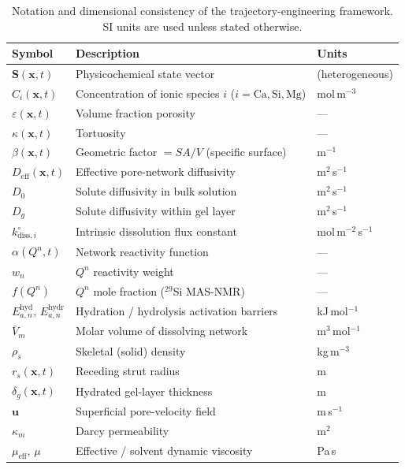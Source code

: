 \documentclass[11pt]{article}
\newcommand{\tablesize}{\fontsize{8.5pt}{10pt}\selectfont}
\newcommand{\Veff}{D_{\mathrm{eff}}}
\begin{document}
\begin{table}[htbp]
\centering
\caption{Notation and dimensional consistency of the trajectory-engineering framework. SI units are used unless stated otherwise.}
\label{tab:notation}
\tablesize
\begin{tabular}{L{2.4cm} L{6.6cm} L{3.4cm}}
\toprule
{}
\textbf{Symbol} & \textbf{Description} & \textbf{Units} \\
\midrule
$\mathbf{S}(\mathbf{x},t)$ & Physicochemical state vector & (heterogeneous) \\
$C_i(\mathbf{x},t)$ & Concentration of ionic species $i$ ($i=\mathrm{Ca,Si,Mg}$) & mol\,m$^{-3}$ \\
$\varepsilon(\mathbf{x},t)$ & Volume fraction porosity & --- \\
$\kappa(\mathbf{x},t)$ & Tortuosity & --- \\
$\beta(\mathbf{x},t)$ & Geometric factor $=SA/V$ (specific surface) & m$^{-1}$ \\
$\Veff(\mathbf{x},t)$ & Effective pore-network diffusivity & m$^{2}$\,s$^{-1}$ \\
$D_0$ & Solute diffusivity in bulk solution & m$^{2}$\,s$^{-1}$ \\
$D_g$ & Solute diffusivity within gel layer & m$^{2}$\,s$^{-1}$ \\
$k^\circ_{\mathrm{diss},i}$ & Intrinsic dissolution flux constant & mol\,m$^{-2}$\,s$^{-1}$ \\
$\alpha(Q^n,t)$ & Network reactivity function & --- \\
$w_n$ & $Q^n$ reactivity weight & --- \\
$f(Q^n)$ & $Q^n$ mole fraction ($^{29}$Si MAS-NMR) & --- \\
$E_{a,n}^{\mathrm{hyd}},\,E_{a,n}^{\mathrm{hydr}}$ & Hydration / hydrolysis activation barriers & kJ\,mol$^{-1}$ \\
$\bar{V}_m$ & Molar volume of dissolving network & m$^{3}$\,mol$^{-1}$ \\
$\rho_s$ & Skeletal (solid) density & kg\,m$^{-3}$ \\
$r_s(\mathbf{x},t)$ & Receding strut radius & m \\
$\delta_g(\mathbf{x},t)$ & Hydrated gel-layer thickness & m \\
$\mathbf{u}$ & Superficial pore-velocity field & m\,s$^{-1}$ \\
$\kappa_m$ & Darcy permeability & m$^{2}$ \\
$\mu_{\mathrm{eff}},\,\mu$ & Effective / solvent dynamic viscosity & Pa\,s \\

\end{tabular}
\end{table}
\end{document}
